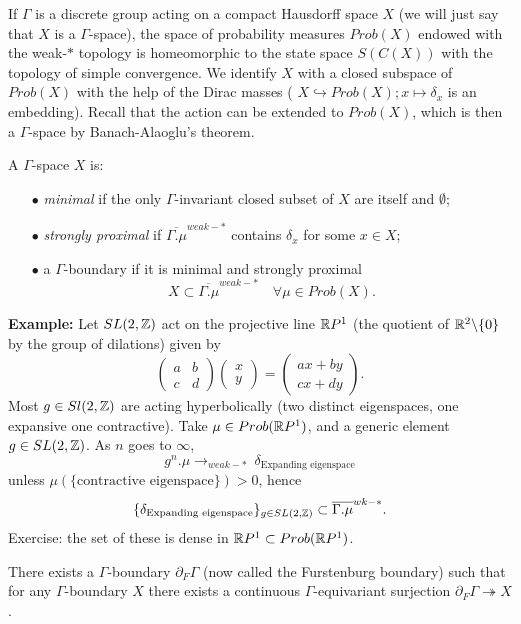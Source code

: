 If $\Gamma$ is a discrete group acting on a compact Hausdorff space $X$ (we will just say that $X$ is a $\Gamma$-space), the space of probability measures $Prob(X)$ endowed with the weak-$*$ topology is homeomorphic to the state space $S(C(X))$ with the topology of simple convergence. We identify $X$ with a closed subspace of $Prob(X)$ with the help of the Dirac masses ( $X \hookrightarrow Prob(X) ; x \mapsto \delta_x$ is an embedding). Recall that the action can be extended to $Prob(X)$, which is then a $\Gamma$-space by Banach-Alaoglu's theorem.

\begin{definition} A $\Gamma$-space $X$ is:
\begin{itemize}
\item[$\bullet$] \textit{minimal} if the only $\Gamma$-invariant closed subset of $X$ are itself and $\emptyset$;
\item[$\bullet$] \textit{strongly proximal} if $\overline{\Gamma . \mu}^{weak-*}$ contains $\delta_x$ for some $x\in X$;
\item[$\bullet$] a $\Gamma$-boundary if it is minimal and strongly proximal
\[ X\subset \overline{\Gamma . \mu}^{weak-*}\quad \forall \mu \in Prob(X).\]
\end{itemize}
\end{definition}

\textbf{Example:} Let $SL(2,\mathbb Z)$ act on the projective line $\mathbb R P^1$ (the quotient of $\mathbb R^2\backslash \{0 \}$ by the group of dilations) given by 
\[\begin{pmatrix} a & b \\ c & d \end{pmatrix} \begin{pmatrix} x \\ y \end{pmatrix} = \begin{pmatrix} ax +b y \\ cx + dy \end{pmatrix}.\]
Most $g\in Sl(2,\mathbb Z)$ are acting hyperbolically (two distinct eigenspaces, one expansive one contractive). Take $\mu\in Prob(\mathbb R P^1)$, and a generic element $g\in SL(2,\mathbb Z)$. As $n$ goes to $\infty$,
\[g^n .\mu \rightarrow_{weak-*} \ \delta_{\text{Expanding eigenspace}}\]
unless $\mu(\{\text{contractive eigenspace}\})>0$, hence \[\{\delta_{\text{Expanding eigenspace}}\}_{g\in SL(2,\mathbb Z)} \subset \overline{\Gamma. \mu}^{wk-*}.\]
Exercise: the set of these is dense in $\mathbb R P^1\subset Prob(\mathbb R P^1)$. 

\begin{thm}[Furstenburg] There exists a $\Gamma$-boundary $\partial_F \Gamma$ (now called the Furstenburg boundary) such that for any $\Gamma$-boundary $X$ there exists a continuous $\Gamma$-equivariant surjection $\partial_F \Gamma \twoheadrightarrow X$.
\end{thm}


